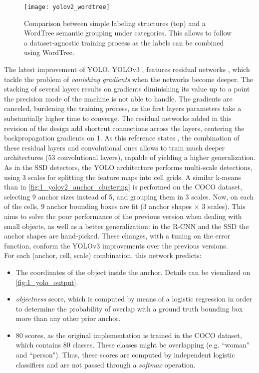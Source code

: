 \begin{figure}[h]
	\centering
	\texttt{[image: yolov2\_wordtree]}
	\caption{Comparison between simple labeling structures (top) and a WordTree semantic grouping under categories. This allows to follow a dataset-agnostic training process as the labels can be combined using WordTree.}
	\label{fig:1_yolov2_wordtree}
\end{figure}



The latest improvement of YOLO, YOLOv3 \cite{yolov3}, features residual networks \cite{resnets}, which tackle the problem of \textit{vanishing gradients} when the networks become deeper. The stacking of several layers results on gradients diminishing its value up to a point the precision mode of the machine is not able to handle. The gradients are canceled, burdening the training process, as the first layers parameters take a substantially higher time to converge. The residual networks added in this revision of the design add shortcut connections across the layers, centering the backpropagation gradients on 1. As this reference states \cite{yolov3}, the combination of these residual layers and convolutional ones allows to train much deeper architectures (53 convolutional layers), capable of yielding a higher generalization. As in the SSD detectors, the YOLO architecture performs multi-scale detections, using 3 scales for splitting the feature maps into cell grids. A similar k-means than in \autoref{fig:1_yolov2_anchor_clustering} is performed on the COCO dataset, selecting 9 anchor sizes instead of 5, and grouping them in 3 scales. Now, on each of the cells, 9 anchor bounding boxes are fit (3 anchor shapes $\times$ 3 scales). This aims to solve the poor performance of the previous version when dealing with small objects, as well as a better generalization: in the R-CNN \cite{rcnn} and the SSD \cite{ssd} the anchor shapes are hand-picked. These changes, with a tuning on the error function, conform the YOLOv3 improvements over the previous versions.\\

For each (anchor, cell, scale) combination, this network predicts:

\begin{itemize}
	\item The coordinates of the object inside the anchor. Details can be visualized on \autoref{fig:1_yolo_output}.
	
	\item \textit{objectness} score, which is computed by means of a logistic regression in order to determine the probability of overlap with a ground truth bounding box more than any other prior anchor.
	
	\item 80 scores, as the original implementation is trained in the COCO dataset, which contains 80 classes. These classes might be overlapping (e.g. ``woman" and ``person"). Thus, these scores are computed by independent logistic classifiers and are not passed through a \textit{softmax} operation.
\end{itemize}


